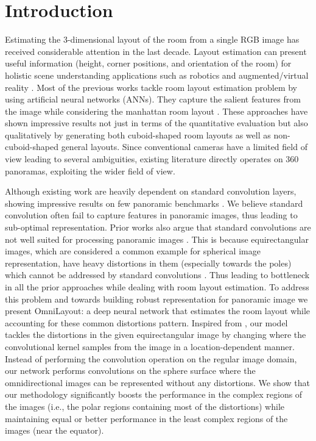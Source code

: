 \documentclass[final]{cvpr}
\begin{document}
\section{Introduction}\label{sec:intro}
Estimating the 3-dimensional layout of the room from a single RGB image has received considerable attention in the last decade. Layout estimation can present useful information (height, corner positions, and orientation of the room)  for holistic scene understanding applications such as robotics and augmented/virtual reality \cite{sun2020hohonet,fernandez2020indoor}. Most of the previous works \cite{sun2019horizonnet,yang2019dula,zou2018layoutnet} tackle room layout estimation problem by using artificial neural networks (ANNs).  They capture the salient features from the image while considering the manhattan room layout \cite{coughlan1999manhattan}. These approaches have shown impressive results not just in terms of the quantitative evaluation but also qualitatively by generating both cuboid-shaped room layouts as well as non-cuboid-shaped general layouts. Since conventional cameras have a limited field of view leading to several ambiguities, existing literature \cite{sun2019horizonnet,yang2019dula,zou2018layoutnet, fernandez2020corners} directly operates on 360 panoramas, exploiting the wider field of view.




Although existing work are heavily dependent on standard convolution layers, showing impressive results on few panoramic benchmarks \cite{sun2019horizonnet,yang2019dula,zou2018layoutnet}. We believe standard convolution often fail to capture features in panoramic images, thus leading to sub-optimal representation. Prior works also argue that standard convolutions are not well suited for processing panoramic images \cite{coors2018spherenet,eder2019mapped}. This is because equirectangular images, which are considered a common example for spherical image representation, have heavy distortions in them (especially towards the poles) which cannot be addressed by standard convolutions \cite{coors2018spherenet, eder2019mapped}. Thus leading to bottleneck in all the prior approaches while dealing with room layout estimation. 
To address this problem and towards building robust representation for panoramic image we present OmniLayout: a deep neural network that estimates the room layout while accounting for these common distortions pattern. Inspired from \cite{coors2018spherenet}, our model tackles the distortions in the given equirectangular image by changing where the convolutional kernel samples from the image in a location-dependent manner. Instead of performing the convolution operation on the regular image domain, our network performs convolutions on the sphere surface where the omnidirectional images can be represented without any distortions. We show that our methodology significantly boosts the performance in the complex regions of the images (i.e., the polar regions containing most of the distortions) while maintaining equal or better performance in the least complex regions of the images (near the equator).
\end{document}
